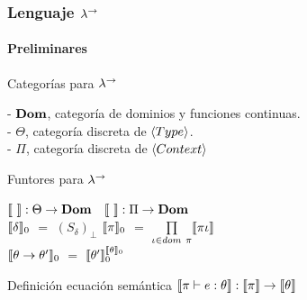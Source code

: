 \documentclass{beamer}
\begin{document}
\begin{frame}
\frametitle{Lenguaje $\lambda^{\rightarrow}$}
\framesubtitle{Preliminares}

\begin{block}{Categorías para $\lambda^{\rightarrow}$}

- $\textbf{Dom}$, categoría de dominios y funciones continuas.\\
- $\Theta$, categoría discreta de $\langle Type \rangle$.\\
- $\Pi$, categoría discreta de $\langle Context \rangle$

\end{block}

\pause

\begin{block}{Funtores para $\lambda^{\rightarrow}$}

$\llbracket  \  \rrbracket : \Theta \rightarrow \textbf{Dom}$ 
\quad \quad \quad \
$\llbracket  \  \rrbracket : \Pi \rightarrow \textbf{Dom}$\\
$\llbracket \delta \rrbracket_0$ $=$ $(S_\delta)_\bot$
\quad \quad \quad \quad
$\llbracket \pi \rrbracket_0$ $=$ $\prod\limits_{\iota \in dom \ \pi} \llbracket \pi\iota \rrbracket$\\
$\llbracket \theta \rightarrow \theta' \rrbracket_0$ $=$ $\llbracket \theta' \rrbracket_0^{\llbracket \theta \rrbracket_0}$

\end{block}

\pause

\begin{block}{Definición ecuación semántica}
$\llbracket \pi \vdash e : \theta \rrbracket : \llbracket \pi \rrbracket \rightarrow \llbracket \theta \rrbracket$
\end{block}

\end{frame}
\end{document}

